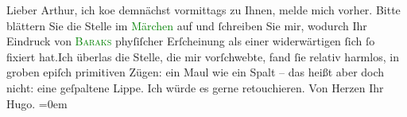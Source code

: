            \pstart
           Lieber Arthur, ich ko{\geminationm}e demnächst vormittags zu Ihnen,
               melde mich vorher.\pend
           \pstart
           Bitte blättern Sie die Stelle im \textcolor{green}{Märchen}{} auf und ſchreiben Sie mir, wodurch Ihr Eindruck von \textcolor{green}{\textsc{Baraks}}{} phyſiſcher {\pb}Erſcheinung als
               einer widerwärtigen ſich ſo fixiert hat.\hspace*{1.5em}Ich überlas
               die Stelle, die mir vorſchwebte, fand ſie relativ harmlos, in groben epiſch
               primitiven Zügen: ein Maul wie ein Spalt – das heißt aber doch nicht: eine geſpaltene
               Lippe.\pend
           \pstart
           Ich würde es gerne retouchieren.\pend
           \pstart
           Von Herzen Ihr{\\[\baselineskip]}\spacefill\mbox{Hugo.}\pend
           \leftskip=0em{}\endnumbering{}  
      